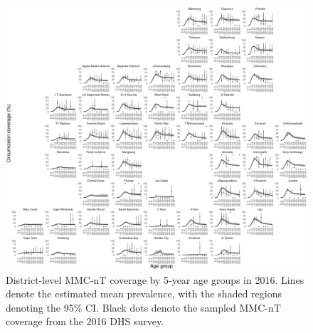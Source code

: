 \documentclass{article}
\begin{document}
\begin{appendix}

\begin{figure}[H]
	\centering
	\includegraphics[width = \linewidth]{Figures/suppmat/ModelFit/MMCnTPrev_5year_District_2016_withsurveypoints}
	\caption{District-level MMC-nT coverage by 5-year age groups in 2016. Lines denote the estimated mean prevalence, with the shaded regions denoting the 95\% CI. Black dots denote the sampled MMC-nT coverage from the 2016 DHS survey.}
\end{figure}



\end{appendix}
\end{document}
